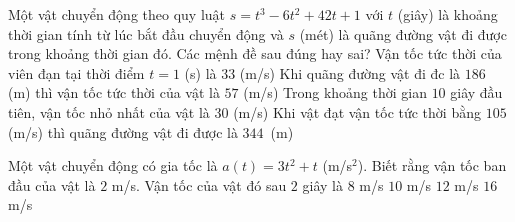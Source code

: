 \begin{ex}%
	Một vật chuyển động theo quy luật $s=t^3-6t^2+42t+1$ với $t$ (giây) là khoảng thời gian tính từ lúc bắt đầu chuyển động và $s$ (mét) là quãng đường vật đi được trong khoảng thời gian đó. Các mệnh đề sau đúng hay sai?
	\choiceTF
	{\True Vận tốc tức thời của viên đạn tại thời điểm $t=1$ (s) là $33$ (m/s)}
	{\True Khi quãng đường vật đi đc là $186$ (m) thì vận tốc tức thời của vật là $57$ (m/s)}
	{\True Trong khoảng thời gian $10$ giây đầu tiên, vận tốc nhỏ nhất của vật là $30$ (m/s)}
	{\True Khi vật đạt vận tốc tức thời bằng $105$ (m/s) thì quãng đường vật đi được là $344$~(m)}
\end{ex}

\begin{ex}%
	Một vật chuyển động có gia tốc là $a\left(t\right)=3 t^2+t$ (m/s$^2$). Biết rằng vận tốc ban đầu của vật là $2$ m/s. Vận tốc của  vật đó sau $2$ giây là
	\choice 
		{$8$ m/s} 
		{$10$ m/s} 
		{\True $12$  m/s}
		{$16$ m/s} 
\end{ex}

